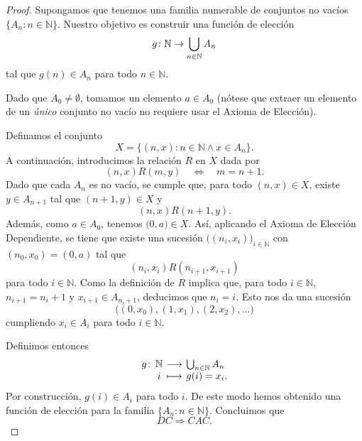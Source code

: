 \documentclass[a4,10pt]{aleph-notas}
\begin{document}
\begin{proof}
    Supongamos que tenemos una familia numerable de conjuntos no vacíos 
    \(
    \{A_n : n \in \mathbb{N}\}.
    \)
    Nuestro objetivo es construir una función de elección 
    \[
        g\colon \mathbb{N} \rightarrow \bigcup_{n \in \mathbb{N}} A_n
    \]
    tal que \(g(n) \in A_n\) para todo \(n \in \mathbb{N}\). 
    
    Dado que \(A_0 \neq \emptyset\), tomamos un elemento \(a \in A_0\) (nótese que extraer 
    un elemento de un \emph{único} conjunto no vacío no requiere usar el Axioma de Elección).
    
    Definamos el conjunto
    \[
    X = \bigl\{ (n,x) : n \in \mathbb{N} \land x \in A_n \bigr\}.
    \]
    A continuación, introducimos la relación \(R\) en \(X\) dada por
    \[
    (n,x) R (m,y)
    \quad\Longleftrightarrow\quad
    m = n+1.
    \]
    Dado que cada \(A_n\) es no vacío, se cumple que, para todo $(n,x)\in X$, existe $y\in A_{n+1}$ tal que $(n+1,y)\in X$ y
    \[
    (n,x) R (n+1,y).
    \]
    Además, como \(a \in A_0\), tenemos \(\bigl(0,a\bigr) \in X\). Así, aplicando el Axioma de Elección Dependiente, se tiene que existe una sucesión 
    \(
    \bigl((n_i,x_i)\bigr)_{i \in \mathbb{N}} 
    \)
    con
    \(
    (n_0,x_0) = (0,a)
    \)
    tal que
    \[(n_i,x_i) R (n_{i+1},x_{i+1})
    \]
    para todo \(i \in \mathbb{N}\).  
    Como la definición de \(R\) implica que, para todo \(i \in \mathbb{N}\), \(n_{i+1} = n_i + 1\) y \(x_{i+1} \in A_{n_i+1}\),
    deducimos que \(n_i = i\). Esto nos da una sucesión 
    \[
    \bigl((0,x_0), (1,x_1), (2,x_2),\dots\bigr)
    \]
    cumpliendo \(x_i \in A_i\) para todo \(i \in \mathbb{N}\). 
    
    Definimos entonces 
    \[
    \funcion{g}{\mathbb{N}}{\bigcup_{n \in \mathbb{N}} A_n}{i}{g(i) = x_i.}
    \]
    Por construcción, \(g(i) \in A_i\) para todo \(i\). De este modo hemos obtenido 
    una función de elección para la familia 
    \(\{A_n : n \in \mathbb{N}\}\). Concluimos que 
    \[
    DC \Longrightarrow CAC.
    \]
\end{proof}

    
\end{document}
